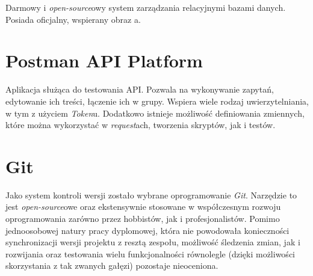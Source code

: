 \par Darmowy i \emph{open-source}owy system zarządzania relacyjnymi bazami danych. Posiada oficjalny, wspierany obraz \emph{\docker}a.

\section{Postman API Platform}

\par Aplikacja służąca do testowania API. Pozwala na wykonywanie zapytań, edytowanie ich treści, łączenie ich w grupy. Wspiera wiele rodzaj uwierzytelniania, w tym z użyciem \emph{Token}u. Dodatkowo istnieje możliwość definiowania zmiennych, które można wykorzystać w \emph{request}ach, tworzenia skryptów, jak i testów\cite{POSTMAN_DOCUMENTATION}.

\section{Git}

\par Jako system kontroli wersji zostało wybrane oprogramowanie \emph{Git}. Narzędzie to jest \emph{open-source}owe oraz ekstensywnie stosowane w współczesnym rozwoju oprogramowania zarówno przez hobbistów, jak i profesjonalistów. Pomimo jednoosobowej natury pracy dyplomowej, która nie powodowała konieczności synchronizacji wersji projektu z resztą zespołu, możliwość śledzenia zmian, jak i rozwijania oraz testowania wielu funkcjonalności równolegle (dzięki możliwości skorzystania z tak zwanych gałęzi) pozostaje nieoceniona.